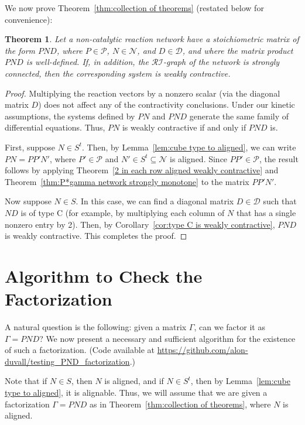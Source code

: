 \documentclass{article}
\newtheorem{fixedtheorem}{Theorem}
\begin{document}
We now prove Theorem~\ref{thm:collection of theorems} (restated below for convenience):

\begin{fixedtheorem}
Let a non-catalytic reaction network have a stoichiometric matrix of the form \( PND \), where \( P \in \mathcal{P} \), \( N \in \mathcal{N} \), and \( D \in \mathcal{D} \), and where the matrix product \( PND \) is well-defined. If, in addition, the \( \mathcal{RI} \)-graph of the network is strongly connected, then the corresponding system is weakly contractive.
\end{fixedtheorem}

\begin{proof}
Multiplying the reaction vectors by a nonzero scalar (via the diagonal matrix \( D \)) does not affect any of the contractivity conclusions. Under our kinetic assumptions, the systems defined by \( PN \) and \( PND \) generate the same family of differential equations. Thus, \( PN \) is weakly contractive if and only if \( PND \) is.

First, suppose \( N \in S^t \). Then, by Lemma~\ref{lem:cube type to aligned}, we can write \( PN = PP'N' \), where \( P' \in \mathcal{P} \) and \( N' \in S^t \subseteq \mathcal{N} \) is aligned. Since \( PP' \in \mathcal{P} \), the result follows by applying Theorem~\ref{2 in each row aligned weakly contractive} and Theorem~\ref{thm:P*gamma network strongly monotone} to the matrix \( PP'N' \).

Now suppose \( N \in S \). In this case, we can find a diagonal matrix \( D \in \mathcal{D} \) such that \( ND \) is of type C (for example, by multiplying each column of \( N \) that has a single nonzero entry by 2). Then, by Corollary~\ref{cor:type C is weakly contractive}, \( PND \) is weakly contractive. This completes the proof.
\end{proof}

\section{Algorithm to Check the Factorization}

A natural question is the following: given a matrix \( \Gamma \), can we factor it as \( \Gamma = PND \)? We now present a necessary and sufficient algorithm for the existence of such a factorization. (Code available at \url{https://github.com/alon-duvall/testing_PND_factorization}.)

Note that if \( N \in S \), then \( N \) is aligned, and if \( N \in S^t \), then by Lemma~\ref{lem:cube type to aligned}, it is alignable. Thus, we will assume that we are given a factorization \( \Gamma = PND \) as in Theorem~\ref{thm:collection of theorems}, where \( N \) is aligned.
\end{document}
